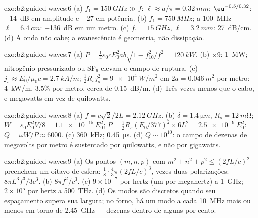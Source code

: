 \begin{solution}{exo:b2:guided-waves:6}
(a) $f_1 = \qty{150}{GHz} \gg f$: $\ell \approx a/\pi = \qty{0.32}{mm}$; $\eu^{-0.5/0.32}$:
\qty{-14}{dB} em amplitude e $-27$ em potência. (b) $f_1 = \qty{750}{MHz}$; a \qty{100}{MHz}
$\ell = \qty{6.4}{cm}$: \qty{-136}{dB} em um metro. (c) $f_1 = \qty{15}{GHz}$, $\ell =
\qty{3.2}{mm}$: \qty{27}{dB/cm}. (d) A onda não cabe; a evanescência é
geometria, não dissipação.
\end{solution}

\begin{solution}{exo:b2:guided-waves:7}
(a) $P = \tfrac14\varepsilon_0cE_0^2ab\sqrt{1 - f_{10}^2/f^2} = \qty{120}{kW}$. (b) $\times9$:
\qty{1}{MW}; nitrogênio pressurizado ou SF$_6$ elevam o campo de ruptura. (c)
$j_s \approx E_0/\mu_0c = \qty{2.7}{kA/m}$; $\tfrac12R_sj_s^2 = \qty{9e4}{W/m^2}$ em $2a =
\qty{0.046}{m^2}$ por metro: \qty{4}{kW/m}, $3.5\%$ por metro, cerca de \qty{0.15}{dB/m}.
(d) Três vezes menos que o cabo, e megawatts em vez de
quilowatts.
\end{solution}

\begin{solution}{exo:b2:guided-waves:8}
(a) $f = c\sqrt2/2L = \qty{2.12}{GHz}$. (b) $\delta = \qty{1.4}{\micro m}$, $R_s = \qty{12}{m\ohm}$;
$W = \varepsilon_0E_0^2V/8 = \qty{1.1e-15}{}E_0^2$; $P = \tfrac12R_s(E_0/377)^2 \times 6L^2 =
\qty{2.5e-9}{}E_0^2$: $Q = \omega W/P \approx 6000$. (c) \qty{360}{kHz}; \qty{0.45}{\micro s}. (d)
$Q \sim 10^{10}$: o campo de dezenas de megavolts por metro é sustentado por
quilowatts, e não por gigawatts.
\end{solution}

\begin{solution}{exo:b2:guided-waves:9}
(a) Os pontos $(m, n, p)$ com $m^2 + n^2 + p^2 \le (2fL/c)^2$ preenchem um oitavo
de esfera: $\tfrac18\cdot\tfrac43\pi(2fL/c)^3$, vezes duas polarizações:
$8\pi L^3f^3/3c^3$. (b) $8\pi f^2/c^3$. (c) $9 \times 10^{-7}$ por hertz (um por
megahertz) a \qty{1}{GHz}; $2 \times 10^5$ por hertz a \qty{500}{THz}. (d) Os modos são
discretos quando seu espaçamento supera sua largura; no forno, há um modo
a cada \qty{10}{MHz} mais ou menos em torno de \qty{2.45}{GHz} --- dezenas dentro de alguns
por cento.
\end{solution}

